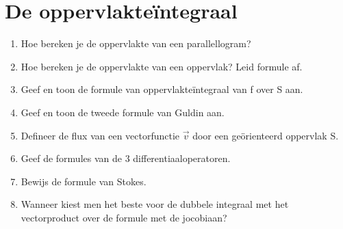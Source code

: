 \documentclass[12pt]{article}
\begin{document}
    \maketitle

    \section{De oppervlakte\"integraal}
    \begin{enumerate}
        \item Hoe bereken je de oppervlakte van een parallellogram?
        \item Hoe bereken je de oppervlakte van een oppervlak? Leid formule af.
        \item Geef en toon de formule van oppervlakteïntegraal van f over S aan.
        \item Geef en toon de tweede formule van Guldin aan.
        \item Defineer de flux van een vectorfunctie $\vec{v}$ door een geörienteerd oppervlak S.
        \item Geef de formules van de 3 differentiaaloperatoren.
        \item Bewijs de formule van Stokes.
	\item Wanneer kiest men het beste voor de dubbele integraal met het vectorproduct over de formule met de jocobiaan?
    \end{enumerate}
    
\end{document}

